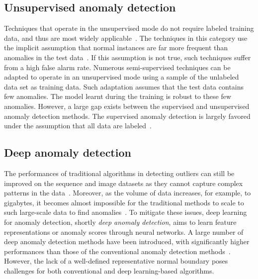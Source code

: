 \subsection{Unsupervised anomaly detection}
\label{ch:background:sec:anomalydetection:subsec:unsupervised}
Techniques that operate in the unsupervised mode do not require labeled training data, and thus are most widely applicable~\cite{ruff2020unifying,ruff2019deep,ruff-etal-2019-self,nedelkoski2019anomaly,nedelkoski2019anomalymultimodal,nedelkoski2020loganomaly,meng2019loganomaly}. The techniques in this category use the implicit assumption that normal instances are far more frequent than anomalies in the test data~\cite{ruff2020unifying}. If this assumption is not true, such techniques suffer from a high false alarm rate. Numerous semi-supervised techniques can be adapted to operate in an unsupervised mode using a sample of the unlabeled data set as training data. Such adaptation assumes that the test data contains few anomalies. The model learnt during the training is robust to these few anomalies. However, a large gap exists between the supervised and unsupervised anomaly detection methods. The supervised anomaly detection is largely favored  under the assumption that all data are labeled~\cite{ruff2020unifying}.

\subsection{Deep anomaly detection}
\label{ch:background:sec:anomalydetection:subsec:deepanomaly}
The performances of traditional algorithms in detecting outliers can still be improved on the sequence and image datasets as they cannot capture complex patterns in the data~\cite{pang2020deep}. Moreover, as the volume of data increases, for example, to gigabytes, it becomes almost impossible for the traditional methods to scale to such large-scale data to find anomalies~\cite{chalapathy2019deep}.
To mitigate these issues, deep learning for anomaly detection, shortly \emph{deep anomaly detection}, aims to learn feature representations or anomaly scores through neural networks. A large number of deep anomaly detection methods have been introduced, with significantly higher performances than those of the conventional anomaly detection methods~\cite{pang2020deep}. However, the lack of a well-defined representative normal boundary poses challenges for both conventional and deep learning-based algorithms.

